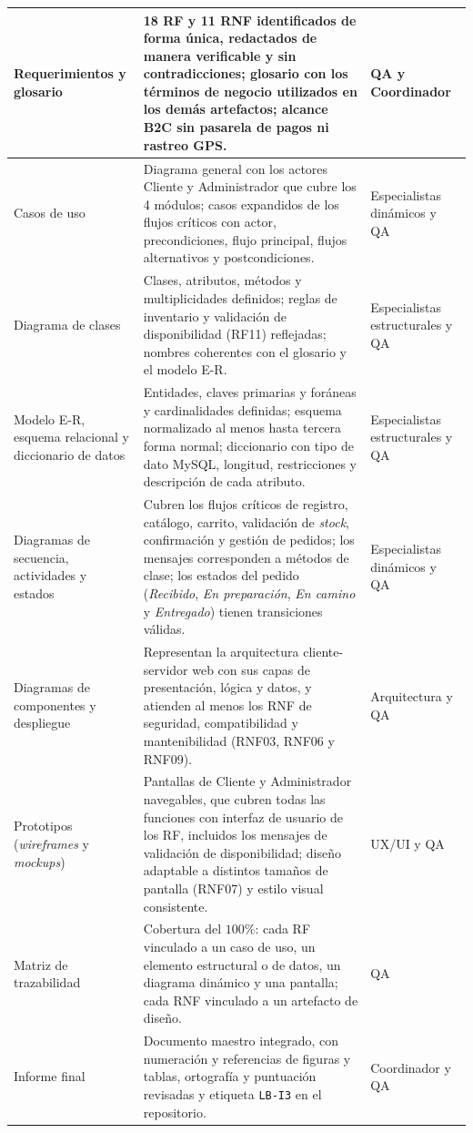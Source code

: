 {\begin{xltabular}{\textwidth}{|>{\raggedright\arraybackslash}p{3.0cm}|X|>{\raggedright\arraybackslash}p{2.6cm}|}
    Requerimientos y glosario & 18 RF y 11 RNF identificados de forma única, redactados de manera verificable y sin contradicciones; glosario con los términos de negocio utilizados en los demás artefactos; alcance B2C sin pasarela de pagos ni rastreo GPS. & QA y Coordinador \\*
    \hline
    Casos de uso & Diagrama general con los actores Cliente y Administrador que cubre los 4 módulos; casos expandidos de los flujos críticos con actor, precondiciones, flujo principal, flujos alternativos y postcondiciones. & Especialistas dinámicos y QA \\*
    \hline
    Diagrama de clases & Clases, atributos, métodos y multiplicidades definidos; reglas de inventario y validación de disponibilidad (RF11) reflejadas; nombres coherentes con el glosario y el modelo E-R. & Especialistas estructurales y QA \\*
    \hline
    Modelo E-R, esquema relacional y diccionario de datos & Entidades, claves primarias y foráneas y cardinalidades definidas; esquema normalizado al menos hasta tercera forma normal; diccionario con tipo de dato MySQL, longitud, restricciones y descripción de cada atributo. & Especialistas estructurales y QA \\*
    \hline
    Diagramas de secuencia, actividades y estados & Cubren los flujos críticos de registro, catálogo, carrito, validación de \textit{stock}, confirmación y gestión de pedidos; los mensajes corresponden a métodos de clase; los estados del pedido (\textit{Recibido}, \textit{En preparación}, \textit{En camino} y \textit{Entregado}) tienen transiciones válidas. & Especialistas dinámicos y QA \\*
    \hline
    Diagramas de componentes y despliegue & Representan la arquitectura cliente-servidor web con sus capas de presentación, lógica y datos, y atienden al menos los RNF de seguridad, compatibilidad y mantenibilidad (RNF03, RNF06 y RNF09). & Arquitectura y QA \\*
    \hline
    Prototipos (\textit{wireframes} y \textit{mockups}) & Pantallas de Cliente y Administrador navegables, que cubren todas las funciones con interfaz de usuario de los RF, incluidos los mensajes de validación de disponibilidad; diseño adaptable a distintos tamaños de pantalla (RNF07) y estilo visual consistente. & UX/UI y QA \\*
    \hline
    Matriz de trazabilidad & Cobertura del $100\%$: cada RF vinculado a un caso de uso, un elemento estructural o de datos, un diagrama dinámico y una pantalla; cada RNF vinculado a un artefacto de diseño. & QA \\*
    \hline
    Informe final & Documento maestro integrado, con numeración y referencias de figuras y tablas, ortografía y puntuación revisadas y etiqueta \texttt{LB-I3} en el repositorio. & Coordinador y QA \\
    \hline
\end{xltabular}
}

